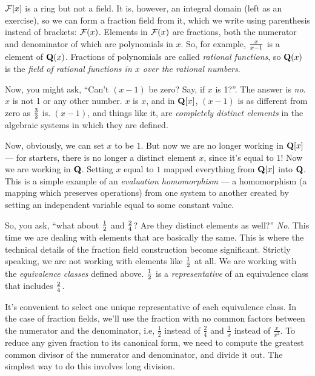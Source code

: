 ${\cal F}[x]$ is a ring but not a field.  It is, however, an
integral domain (left as an exercise), so we can form a fraction field
from it, which we write using parenthesis instead of brackets: ${\cal
F}(x)$.  Elements in ${\cal F}(x)$ are fractions, both the numerator
and denominator of which are polynomials in $x$.  So, for example,
${x}\over{x-1}$ is a element of ${\bf Q}(x)$.  Fractions of
polynomials are called {\it rational functions}, so ${\bf Q}(x)$ is
the {\it field of rational functions in $x$ over the rational numbers}.

Now, you might ask, ``Can't $(x-1)$ be zero?  Say, if $x$ is 1?''.
The answer is {\it no}.  $x$ is not 1 or any other number.  $x$ is
$x$, and in ${\bf Q}[x]$, $(x-1)$ is as different from zero as $3
\over 2$ is.  $(x-1)$, and things like it, are {\it
completely distinct elements} in the algebraic systems in which they
are defined.

Now, obviously, we can set $x$ to be $1$.  But now we are no longer
working in ${\bf Q}[x]$ --- for starters, there is no longer a
distinct element $x$, since it's equal to $1$!  Now we are working in
${\bf Q}$.  Setting $x$ equal to $1$ mapped everything from ${\bf
Q}[x]$ into ${\bf Q}$.  This is a simple example of an {\it evaluation
homomorphism} --- a homomorphism (a mapping which preserves
operations) from one system to another created by setting an
independent variable equal to some constant value.

So, you ask, ``what about $1\over2$ and $2\over4$?  Are they distinct
elements as well?''  {\it No}.  This time we are dealing with elements
that are basically the same. This is where the technical details of
the fraction field construction become significant.  Strictly
speaking, we are not working with elements like $1\over2$ at all.  We
are working with the {\it equivalence classes} defined above.
$1\over2$ is a {\it representative} of an equivalence class that
includes $2\over4$.

It's convenient to select one unique representative of each
equivalence class.  In the case of fraction fields, we'll use the
fraction with no common factors between the numerator and the
denominator, i.e, $\frac{1}{2}$ instead of $\frac{2}{4}$ and
$\frac{1}{x}$ instead of $\frac{x}{x^2}$.  To reduce any given
fraction to its canonical form, we need to compute the greatest common
divisor of the numerator and denominator, and divide it out.
The simplest way to do this involves long division.

